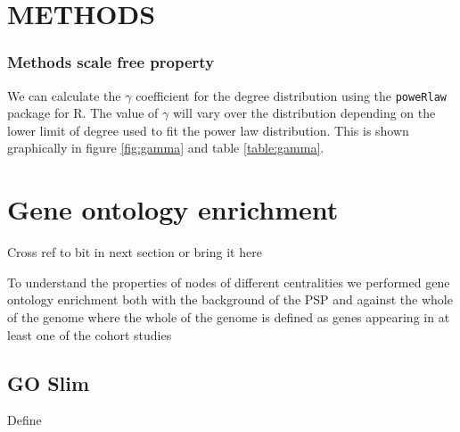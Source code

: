 






\section{METHODS}

\subsubsection{Methods scale free property}
We can calculate the $\gamma$ coefficient for the degree distribution using the \texttt{poweRlaw} package for R. The value of $\gamma$ will vary over the distribution depending on the lower limit of degree used to fit the power law distribution. This is shown graphically in figure \ref{fig:gamma} and table \ref{table:gamma}.


\section{Gene ontology enrichment}
Cross ref to bit in next section or bring it here

To understand the properties of nodes of different centralities we performed gene ontology enrichment both with the background of the PSP and against the whole of the genome where the whole of the genome is defined as genes appearing in at least one of the cohort studies 

\subsection{GO Slim}
Define

